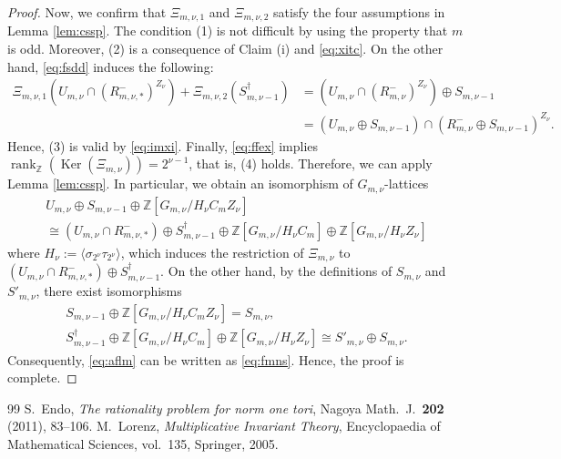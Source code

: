 \documentclass[10pt,a4paper]{amsart}
\newcommand{\Z}{\mathbb{Z}}
\DeclareMathOperator{\Ker}{Ker}
\DeclareMathOperator{\rk}{rank}
\begin{document}
\begin{proof}
Now, we confirm that $\Xi_{m,\nu,1}$ and $\Xi_{m,\nu,2}$ satisfy the four assumptions in Lemma \ref{lem:cssp}. The condition (1) is not difficult by using the property that $m$ is odd. Moreover, (2) is a consequence of Claim (i) and \eqref{eq:xitc}. On the other hand, \eqref{eq:fsdd} induces the following: 
\begin{align*}
\Xi_{m,\nu,1}(U_{m,\nu}\cap (R_{m,\nu,\ast}^{-})^{Z_{\nu}})+\Xi_{m,\nu,2}(S_{m,\nu-1}^{\dagger})&=(U_{m,\nu}\cap (R_{m,\nu}^{-})^{Z_{\nu}})\oplus S_{m,\nu-1}\\
&=(U_{m,\nu}\oplus S_{m,\nu-1})\cap (R_{m,\nu}^{-}\oplus S_{m,\nu-1})^{Z_{\nu}}. 
\end{align*}
Hence, (3) is valid by \eqref{eq:imxi}. Finally, \eqref{eq:ffex} implies $\rk_{\Z}(\Ker(\Xi_{m,\nu}))=2^{\nu-1}$, that is, (4) holds. Therefore, we can apply Lemma \ref{lem:cssp}. In particular, we obtain an isomorphism of $G_{m,\nu}$-lattices
\begin{equation}\label{eq:aflm}
\begin{gathered}
U_{m,\nu}\oplus S_{m,\nu-1}\oplus \Z[G_{m,\nu}/H_{\nu}C_{m}Z_{\nu}]
\\ \cong (U_{m,\nu}\cap R_{m,\nu,\ast}^{-})\oplus S_{m,\nu-1}^{\dagger}\oplus \Z[G_{m,\nu}/H_{\nu}C_{m}]\oplus \Z[G_{m,\nu}/H_{\nu}Z_{\nu}]
\end{gathered}
\end{equation}
where $H_{\nu}:=\langle \sigma_{2^{\nu}}\tau_{2^{\nu}}\rangle$, which induces the restriction of $\Xi_{m,\nu}$ to $(U_{m,\nu}\cap R_{m,\nu,\ast}^{-})\oplus S_{m,\nu-1}^{\dagger}$. On the other hand, by the definitions of $S_{m,\nu}$ and $S'_{m,\nu}$, there exist isomorphisms
\begin{gather*}
S_{m,\nu-1}\oplus \Z[G_{m,\nu}/H_{\nu}C_{m}Z_{\nu}]=S_{m,\nu},\\
S_{m,\nu-1}^{\dagger}\oplus \Z[G_{m,\nu}/H_{\nu}C_{m}]\oplus \Z[G_{m,\nu}/H_{\nu}Z_{\nu}]
\cong S'_{m,\nu}\oplus S_{m,\nu}.
\end{gather*}
Consequently, \eqref{eq:aflm} can be written as \eqref{eq:fmns}. Hence, the proof is complete. 
\end{proof}

\begin{thebibliography}{99}
 S.~Endo, \emph{The rationality problem for norm one tori}, Nagoya Math.~J.~\textbf{202} (2011), 83--106.
 M.~Lorenz, \emph{Multiplicative Invariant Theory}, Encyclopaedia of Mathematical Sciences, vol.~135, Springer, 2005.
\end{thebibliography}
\end{document}
